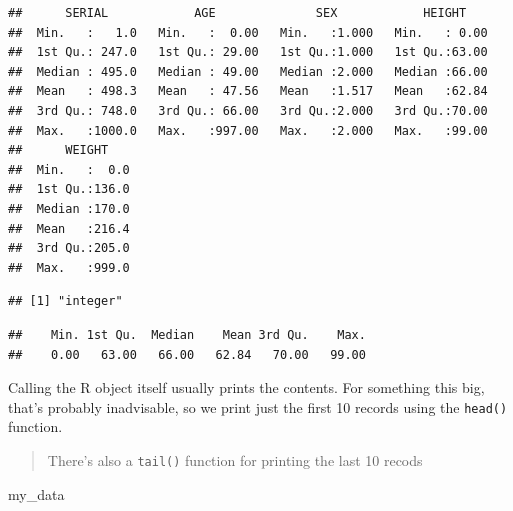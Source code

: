 \documentclass[
]{book}
\newenvironment{Shaded}{\begin{snugshade}}{\end{snugshade}}
\newcommand{\FunctionTok}[1]{\textcolor[rgb]{0.13,0.29,0.53}{\textbf{#1}}}
\newcommand{\NormalTok}[1]{#1}
\newcommand{\SpecialCharTok}[1]{\textcolor[rgb]{0.81,0.36,0.00}{\textbf{#1}}}
\begin{document}
\begin{verbatim}
##      SERIAL            AGE              SEX            HEIGHT     
##  Min.   :   1.0   Min.   :  0.00   Min.   :1.000   Min.   : 0.00  
##  1st Qu.: 247.0   1st Qu.: 29.00   1st Qu.:1.000   1st Qu.:63.00  
##  Median : 495.0   Median : 49.00   Median :2.000   Median :66.00  
##  Mean   : 498.3   Mean   : 47.56   Mean   :1.517   Mean   :62.84  
##  3rd Qu.: 748.0   3rd Qu.: 66.00   3rd Qu.:2.000   3rd Qu.:70.00  
##  Max.   :1000.0   Max.   :997.00   Max.   :2.000   Max.   :99.00  
##      WEIGHT     
##  Min.   :  0.0  
##  1st Qu.:136.0  
##  Median :170.0  
##  Mean   :216.4  
##  3rd Qu.:205.0  
##  Max.   :999.0
\end{verbatim}

\begin{Shaded}
\end{Shaded}

\begin{verbatim}
## [1] "integer"
\end{verbatim}

\begin{Shaded}
\end{Shaded}

\begin{verbatim}
##    Min. 1st Qu.  Median    Mean 3rd Qu.    Max. 
##    0.00   63.00   66.00   62.84   70.00   99.00
\end{verbatim}

Calling the R object itself usually prints the contents. For something this big, that's probably inadvisable, so we print just the first 10 records using the \texttt{head()} function.

\begin{quote}
There's also a \texttt{tail()} function for printing the last 10 recods
\end{quote}

\begin{Shaded}
\begin{Highlighting}[]
\NormalTok{my\_data}
\end{Highlighting}
\end{Shaded}
\end{document}
